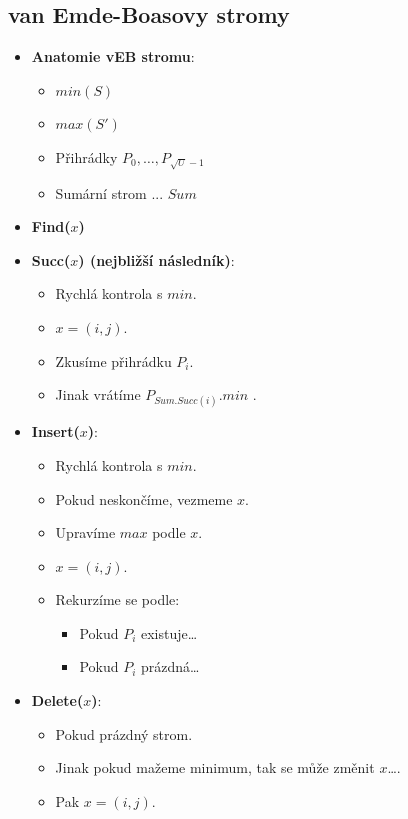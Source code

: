 \documentclass[11pt,a4paper]{article}
\begin{document}
\subsection{van Emde-Boasovy stromy}
\begin{itemize}
    \item \textbf{Anatomie vEB stromu}:
    \begin{itemize}
        \item $min(S)$
        \item $max(S')$
        \item Přihrádky $P_0,\ldots,P_{\sqrt{U}-1}$
        \item Sumární strom ... $Sum$
    \end{itemize}
    \item \textbf{Find($x$)}
    \item \textbf{Succ($x$) (nejbližší následník)}:
    \begin{itemize}
        \item Rychlá kontrola s $min$.
        \item $x = (i,j)$.
        \item Zkusíme přihrádku $P_i$.
        \item Jinak vrátíme $P_{Sum.Succ(i)}.min$ . 
    \end{itemize}
    \item \textbf{Insert($x$)}:
    \begin{itemize}
        \item Rychlá kontrola s $min$.
        \item Pokud neskončíme, vezmeme $x$.
        \item Upravíme $max$ podle $x$.
        \item $x = (i,j)$.
        \item Rekurzíme se podle:
        \begin{itemize}
            \item Pokud $P_i$ existuje\dots
            \item Pokud $P_i$ prázdná\dots
        \end{itemize}
    \end{itemize}
    \item \textbf{Delete($x$)}:
    \begin{itemize}
        \item Pokud prázdný strom.
        \item Jinak pokud mažeme minimum, tak se může změnit $x$\dots.
        \item Pak $x = (i,j)$.

\end{itemize}
\end{itemize}
\end{document}
